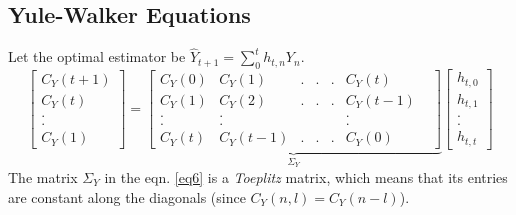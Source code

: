 \documentclass[a4paper,english,12pt]{article}
\begin{document}
\subsection{Yule-Walker Equations}
Let the optimal estimator be $\hat{Y}_{t+1}=\sum_0^t h_{t,n}Y_n.$
\begin{equation}
\begin{bmatrix}
C_Y(t+1)\\
C_Y(t)\\
. \\
. \\
C_Y (1)
\end{bmatrix}
=
\underbrace{\begin{bmatrix}
C_Y(0) & C_Y(1) & .& .& .& C_Y(t)\\
C_Y(1) & C_Y(2) & .&. & .& C_Y(t-1)\\ 
. & .& & &  & .&  \\
. & .& & &  & .&  \\
C_Y(t) & C_Y(t-1) & .& .& .& C_Y(0) 
\end{bmatrix}}_{\Sigma_Y}
\begin{bmatrix}
h_{t,0} \\
h_{t,1}\\
.\\
.\\
h_{t,t} 
\end{bmatrix} \label{eq6}
\end{equation}
The matrix $\Sigma_Y$ in the eqn. \eqref{eq6} is a \textit{Toeplitz}
matrix, which means that its entries are constant along the diagonals (since $C_Y(n,l)=C_Y(n-l)$).
\end{document}
